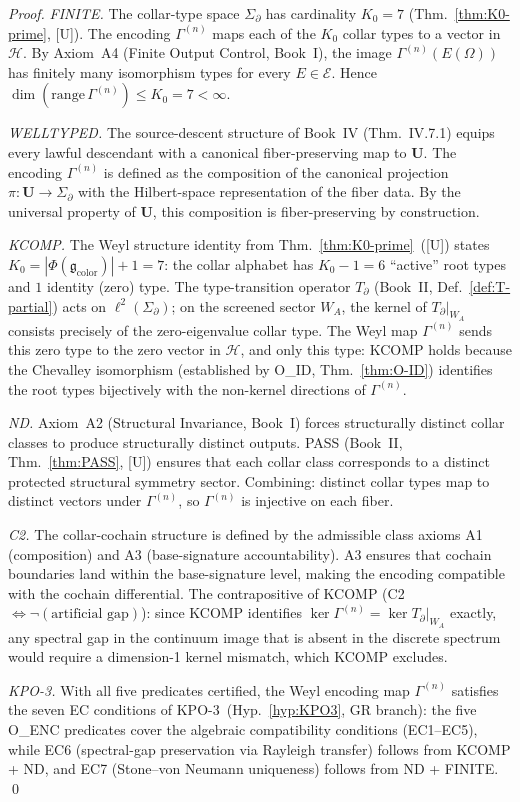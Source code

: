\documentclass[12pt,oneside]{amsbook}
\theoremstyle{plain}
\theoremstyle{definition}
\theoremstyle{remark}
\begin{document}
\begin{proof}
\textit{FINITE.}
The collar-type space $\Sigma_\partial$ has cardinality $K_0 = 7$
(Thm.~\ref{thm:K0-prime}, [U]). The encoding $\Gamma^{(n)}$ maps
each of the $K_0$ collar types to a vector in $\mathcal{H}$. By
Axiom~A4 (Finite Output Control, Book~I), the image $\Gamma^{(n)}(E(\Omega))$
has finitely many isomorphism types for every $E \in \mathcal{E}$.
Hence $\dim(\mathrm{range}\,\Gamma^{(n)}) \leq K_0 = 7 < \infty$.

\textit{WELLTYPED.}
The source-descent structure of Book~IV
(Thm.~IV.7.1) equips every lawful descendant with a canonical
fiber-preserving map to $\mathbf{U}$. The encoding $\Gamma^{(n)}$
is defined as the composition of the canonical projection
$\pi: \mathbf{U} \to \Sigma_\partial$ with the Hilbert-space
representation of the fiber data. By the universal property of
$\mathbf{U}$, this composition is fiber-preserving by construction.

\textit{KCOMP.}
The Weyl structure identity from Thm.~\ref{thm:K0-prime}~([U])
states $K_0 = |\Phi(\mathfrak{g}_{\mathrm{color}})| + 1 = 7$:
the collar alphabet has $K_0 - 1 = 6$ ``active'' root types and
$1$ identity (zero) type. The type-transition operator $T_\partial$
(Book~II, Def.~\ref{def:T-partial}) acts on $\ell^2(\Sigma_\partial)$;
on the screened sector $W_A$, the kernel of $T_\partial|_{W_A}$
consists precisely of the zero-eigenvalue collar type. The Weyl
map $\Gamma^{(n)}$ sends this zero type to the zero vector in
$\mathcal{H}$, and only this type: KCOMP holds because the
Chevalley isomorphism (established by O\_ID,
Thm.~\ref{thm:O-ID}) identifies the root types bijectively with
the non-kernel directions of $\Gamma^{(n)}$.

\textit{ND.}
Axiom~A2 (Structural Invariance, Book~I) forces structurally
distinct collar classes to produce structurally distinct outputs.
PASS (Book~II, Thm.~\ref{thm:PASS}, [U]) ensures that each
collar class corresponds to a distinct protected structural
symmetry sector. Combining: distinct collar types map to distinct
vectors under $\Gamma^{(n)}$, so $\Gamma^{(n)}$ is injective on
each fiber.

\textit{C2.}
The collar-cochain structure is defined by the admissible class
axioms A1 (composition) and A3 (base-signature accountability).
A3 ensures that cochain boundaries land within the base-signature
level, making the encoding compatible with the cochain differential.
The contrapositive of KCOMP (C2 $\Leftrightarrow \neg(\text{artificial gap})$):
since KCOMP identifies $\ker\Gamma^{(n)} = \ker T_\partial|_{W_A}$
exactly, any spectral gap in the continuum image that is absent
in the discrete spectrum would require a dimension-1 kernel
mismatch, which KCOMP excludes.

\textit{KPO-3.}
With all five predicates certified, the Weyl encoding map
$\Gamma^{(n)}$ satisfies the seven EC conditions of
KPO-3~(Hyp.~\ref{hyp:KPO3}, GR branch): the five O\_ENC
predicates cover the algebraic compatibility conditions
(EC1--EC5), while EC6 (spectral-gap preservation via Rayleigh
transfer) follows from KCOMP + ND, and EC7 (Stone--von Neumann
uniqueness) follows from ND + FINITE.
\qed
\end{proof}
\end{document}
